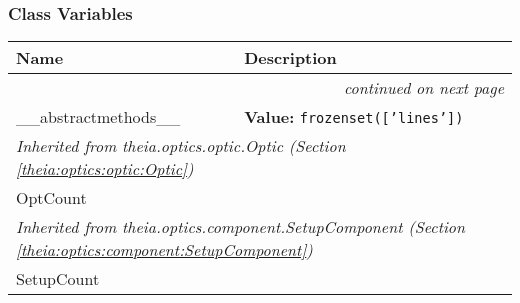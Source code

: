   \subsubsection{Class Variables}

    \vspace{-1cm}
\hspace{\varindent}\begin{longtable}{|p{\varnamewidth}|p{\vardescrwidth}|l}
\cline{1-2}
\cline{1-2} \centering \textbf{Name} & \centering \textbf{Description}& \\
\cline{1-2}
\endhead\cline{1-2}\multicolumn{3}{r}{\small\textit{continued on next page}}\\\endfoot\cline{1-2}
\endlastfoot\raggedright \_\-\_\-a\-b\-s\-t\-r\-a\-c\-t\-m\-e\-t\-h\-o\-d\-s\-\_\-\_\- & \raggedright \textbf{Value:} 
{\tt \texttt{frozenset([}\texttt{'}\texttt{lines}\texttt{'}\texttt{])}}&\\
\cline{1-2}
\multicolumn{2}{|l|}{\textit{Inherited from theia.optics.optic.Optic \textit{(Section \ref{theia:optics:optic:Optic})}}}\\
\multicolumn{2}{|p{\varwidth}|}{\raggedright OptCount}\\
\cline{1-2}
\multicolumn{2}{|l|}{\textit{Inherited from theia.optics.component.SetupComponent \textit{(Section \ref{theia:optics:component:SetupComponent})}}}\\
\multicolumn{2}{|p{\varwidth}|}{\raggedright SetupCount}\\
\cline{1-2}
\end{longtable}

